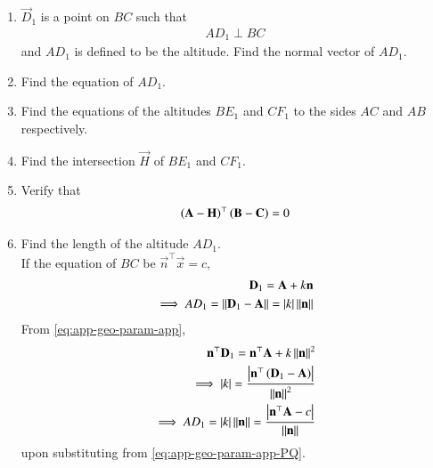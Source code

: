\begin{enumerate}[label=\thesubsection.\arabic*.,ref=\thesubsection.\theenumi]
\item $\vec{D}_1$ is a point on $BC$ such that
		\begin{align}
			AD_1 \perp BC
		\end{align}
		and $AD_1$ is defined to be the altitude. 
		Find the normal vector of $AD_1$.
  \\
		
	\item Find the equation of $AD_1$.
 \\     

	\item Find the equations of the altitudes $BE_1$ and $CF_1$ to the sides $AC$ and $AB$ respectively. 
  \\     
	\item Find the intersection $\vec{H}$ of $BE_1$ and $CF_1$.
 \\
        
	\item Verify that 
		\begin{align}
			\left(\mathbf{A}-\mathbf{H}\right)^{\top}\left(\mathbf{B}-\mathbf{C}\right) = 0
		\end{align}
  
  \item Find the length of the altitude $AD_1$.
	  \\
		\solution 
		If the equation of $BC$ be $\vec{n}^\top\vec{x} =c$,
\begin{align}
			\label{eq:app-geo-param-app}
	\mathbf{D}_1 = \mathbf{A} + k\mathbf{n}
	\\
	\implies AD_1 = \left\lVert\mathbf{D}_1 - \mathbf{A}\right\rVert=\left\vert k\right\vert \left\lVert\mathbf{n}\right\rVert
			\label{eq:app-geo-param-app-PQ}
\end{align}
			From \eqref{eq:app-geo-param-app},
\begin{align}
	\mathbf{n}^{\top}  \mathbf{D}_1 = \mathbf{n}^{\top}  \mathbf{A} + k\left\lVert\mathbf{n}\right\rVert^2
	\\
	\implies \left\vert k\right\vert = 
	\frac{\left\vert\mathbf{n}^{\top}\left(\mathbf{D}_1 - \mathbf{A}\right)\right\vert}{\left\lVert\mathbf{n}\right\rVert^2}
			\label{eq:app-geo-param-app-k}
			\\
	\implies AD_1 =\left\vert k\right\vert  
		\left\lVert\mathbf{n}\right\rVert	=
	\frac{\left\vert\mathbf{n}^{\top}\mathbf{A} - c\right\vert}{\left\lVert\mathbf{n}\right\rVert}
			\label{eq:app-PQ-final}
\end{align}
upon substituting from 
			\eqref{eq:app-geo-param-app-PQ}.

\end{enumerate}
